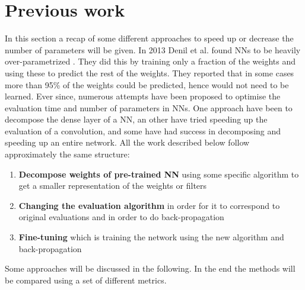\section{Previous work} \label{tex:previous_work}
In this section a recap of some different approaches to speed up or decrease the number of parameters will be given. In 2013 Denil et al. found NNs to be heavily over-parametrized \cite{Denil2013}. They did this by training only a fraction of the weights and using these to predict the rest of the weights. They reported that in some cases more than 95\% of the weights could be predicted, hence would not need to be learned. Ever since, numerous attempts have been proposed to optimise the evaluation time and number of parameters in NNs. One approach have been to decompose the dense layer of a NN, an other have tried speeding up the evaluation of a convolution, and some have had success in decomposing and speeding up an entire network. All the work described below follow approximately the same structure:

\begin{enumerate}
    \item \textbf{Decompose weights of pre-trained NN} using some specific algorithm to get a smaller representation of the weights or filters
    \item \textbf{Changing the evaluation algorithm} in order for it to correspond to original evaluations and in order to do back-propagation
    \item \textbf{Fine-tuning} which is training the network using the new algorithm and back-propagation 
\end{enumerate}
Some approaches will be discussed in the following. In the end the methods will be compared using a set of different metrics. 

